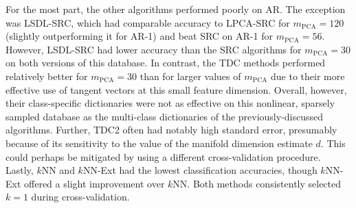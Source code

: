 \documentclass[review]{elsarticle}
\begin{document}
For the most part, the other algorithms performed poorly on AR. The exception was LSDL-SRC, which had comparable accuracy to LPCA-SRC for $m_\mathrm{PCA} = 120$ (slightly outperforming it for AR-1) and beat SRC on AR-1 for $m_\mathrm{PCA} = 56$. However, LSDL-SRC had lower accuracy than the SRC algorithms for $m_\mathrm{PCA} = 30$ on both versions of this database. In contrast, the TDC methods performed relatively better for $m_\mathrm{PCA}=30$ than for larger values of $m_\mathrm{PCA}$ due to their more effective use of tangent vectors at this small feature dimension. Overall, however, their class-specific dictionaries were not as effective on this nonlinear, sparsely sampled database as the multi-class dictionaries of the previously-discussed algorithms. Further, TDC2 often had notably high standard error, presumably because of its sensitivity to the value of the manifold dimension estimate $d$. This could perhaps be mitigated by using a different cross-validation procedure. Lastly, $k$NN and $k$NN-Ext had the lowest classification accuracies, though $k$NN-Ext offered a slight improvement over $k$NN. Both methods consistently selected $k=1$ during cross-validation.
\end{document}

